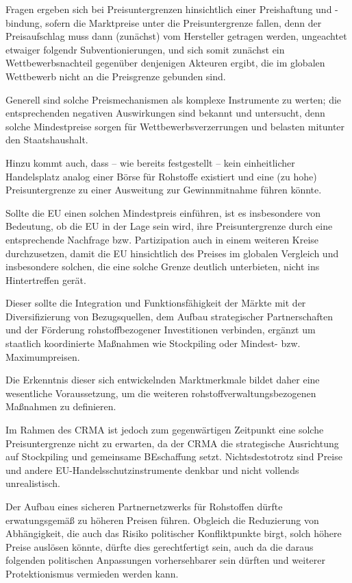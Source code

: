 \documentclass[12pt,a4paper,oneside]{book} %
\begin{document}
Fragen ergeben sich bei Preisuntergrenzen hinsichtlich einer Preishaftung und -bindung, sofern die Marktpreise unter die Preisuntergrenze fallen, denn der Preisaufschlag muss dann (zunächst) vom Hersteller getragen werden, ungeachtet etwaiger folgendr Subventionierungen, und sich somit zunächst ein Wettbewerbsnachteil gegenüber denjenigen Akteuren ergibt, die im globalen Wettbewerb nicht an die Preisgrenze gebunden sind. 

Generell sind solche Preismechanismen als komplexe Instrumente zu werten; die entsprechenden negativen Auswirkungen sind bekannt und untersucht, denn solche Mindestpreise sorgen für Wettbewerbsverzerrungen und belasten mitunter den Staatshaushalt.\autocites{https://iea.org.uk/publications/research/flaws-and-ceilings-price-controls-and-the-damage-they-cause/}{Financial Tools for Boosting Resilience of CRM Value Chains and Strategic Stockpiling }

Hinzu kommt auch, dass -- wie bereits festgestellt -- kein einheitlicher Handelsplatz analog einer Börse für Rohstoffe existiert und eine (zu hohe) Preisuntergrenze zu einer Ausweitung zur Gewinnmitnahme führen könnte.

Sollte die EU einen solchen Mindestpreis einführen, ist es insbesondere von Bedeutung, ob die EU in der Lage sein wird, ihre Preisuntergrenze durch eine entsprechende Nachfrage bzw. Partizipation auch in einem weiteren Kreise durchzusetzen, damit die EU hinsichtlich des Preises im globalen Vergleich und insbesondere solchen, die eine solche Grenze deutlich unterbieten, nicht ins Hintertreffen gerät.

Dieser sollte die Integration und Funktionsfähigkeit der Märkte mit der Diversifizierung von Bezugsquellen, dem Aufbau strategischer Partnerschaften und der Förderung rohstoffbezogener Investitionen verbinden, ergänzt um staatlich koordinierte Maßnahmen wie Stockpiling oder Mindest- bzw. Maximumpreisen.

Die Erkenntnis dieser sich entwickelnden Marktmerkmale bildet daher eine wesentliche Voraussetzung, um die weiteren rohstoffverwaltungsbezogenen Maßnahmen zu definieren.

Im Rahmen des CRMA ist jedoch zum gegenwärtigen Zeitpunkt eine solche Preisuntergrenze nicht zu erwarten, da der CRMA die strategische Ausrichtung auf Stockpiling und gemeinsame BEschaffung setzt. Nichtsdestotrotz sind Preise und andere EU-Handelsschutzinstrumente denkbar und nicht vollends unrealistisch.

Der Aufbau eines sicheren Partnernetzwerks für Rohstoffen dürfte erwatungsgemäß zu höheren Preisen führen. Obgleich die Reduzierung von Abhängigkeit, die auch das Risiko politischer Konfliktpunkte birgt, solch höhere Preise auslösen könnte, dürfte dies gerechtfertigt sein, auch da die daraus folgenden politischen Anpassungen vorhersehbarer sein dürften und weiterer Protektionismus vermieden werden kann.\autocite{McBridge, S. 26}
\end{document}
